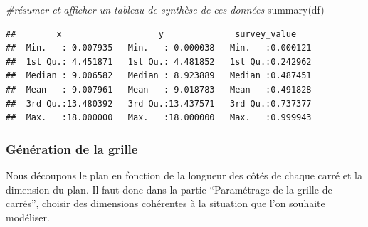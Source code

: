 \documentclass[
]{article}
\newenvironment{Shaded}{\begin{snugshade}}{\end{snugshade}}
\newcommand{\CommentTok}[1]{\textcolor[rgb]{0.56,0.35,0.01}{\textit{#1}}}
\newcommand{\DecValTok}[1]{\textcolor[rgb]{0.00,0.00,0.81}{#1}}
\newcommand{\FunctionTok}[1]{\textcolor[rgb]{0.00,0.00,0.00}{#1}}
\newcommand{\NormalTok}[1]{#1}
\newcommand{\OtherTok}[1]{\textcolor[rgb]{0.56,0.35,0.01}{#1}}
\newcommand{\SpecialCharTok}[1]{\textcolor[rgb]{0.00,0.00,0.00}{#1}}
\begin{document}
\begin{Shaded}
\end{Shaded}

\begin{Shaded}
\begin{Highlighting}[]
\CommentTok{\#résumer et afficher un tableau de synthèse de ces données}
\FunctionTok{summary}\NormalTok{(df)}
\end{Highlighting}
\end{Shaded}

\begin{verbatim}
##        x                   y              survey_value     
##  Min.   : 0.007935   Min.   : 0.000038   Min.   :0.000121  
##  1st Qu.: 4.451871   1st Qu.: 4.481852   1st Qu.:0.242962  
##  Median : 9.006582   Median : 8.923889   Median :0.487451  
##  Mean   : 9.007961   Mean   : 9.018783   Mean   :0.491828  
##  3rd Qu.:13.480392   3rd Qu.:13.437571   3rd Qu.:0.737377  
##  Max.   :18.000000   Max.   :18.000000   Max.   :0.999943
\end{verbatim}

\hypertarget{guxe9nuxe9ration-de-la-grille}{%
\subsubsection{Génération de la
grille}\label{guxe9nuxe9ration-de-la-grille}}

Nous découpons le plan en fonction de la longueur des côtés de chaque
carré et la dimension du plan. Il faut donc dans la partie ``Paramétrage
de la grille de carrés'', choisir des dimensions cohérentes à la
situation que l'on souhaite modéliser.
\end{document}
